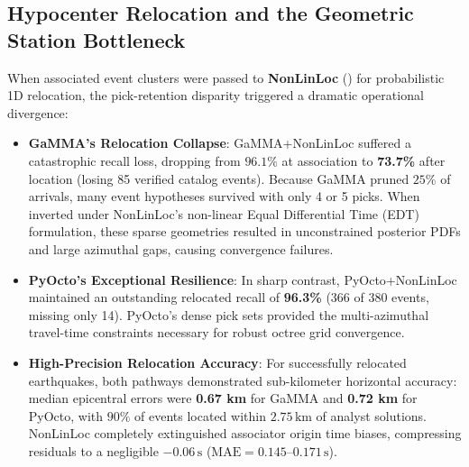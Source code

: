 \subsection{Hypocenter Relocation and the Geometric Station Bottleneck}
When associated event clusters were passed to \textbf{NonLinLoc} (\cite{NonLinLoc}) for probabilistic 1D relocation, the pick-retention disparity triggered a dramatic operational divergence:
\begin{itemize}
  \item \textbf{GaMMA's Relocation Collapse}: GaMMA+NonLinLoc suffered a catastrophic recall loss, dropping from $96.1\%$ at association to \textbf{73.7\%} after location (losing 85 verified catalog events). Because GaMMA pruned $25\%$ of arrivals, many event hypotheses survived with only 4 or 5 picks. When inverted under NonLinLoc's non-linear Equal Differential Time (\ac{EDT}) formulation, these sparse geometries resulted in unconstrained posterior PDFs and large azimuthal gaps, causing convergence failures.
  \item \textbf{PyOcto's Exceptional Resilience}: In sharp contrast, PyOcto+NonLinLoc maintained an outstanding relocated recall of \textbf{96.3\%} (366 of 380 events, missing only 14). PyOcto's dense pick sets provided the multi-azimuthal travel-time constraints necessary for robust octree grid convergence.
  \item \textbf{High-Precision Relocation Accuracy}: For successfully relocated earthquakes, both pathways demonstrated sub-kilometer horizontal accuracy: median epicentral errors were \textbf{0.67 km} for GaMMA and \textbf{0.72 km} for PyOcto, with $90\%$ of events located within $2.75\,\unit{\kilo\meter}$ of analyst solutions. NonLinLoc completely extinguished associator origin time biases, compressing residuals to a negligible $-0.06\,\unit{\second}$ ($\mathrm{MAE} = 0.145\text{--}0.171\,\unit{\second}$).
\end{itemize}

